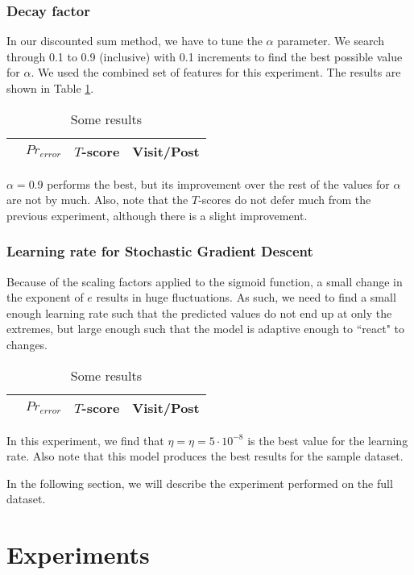 \subsubsection{Decay factor}
In our discounted sum method, we have to tune the $\alpha$ parameter. We search 
through 0.1 to 0.9 (inclusive) with 0.1 increments to find the best possible 
value for $\alpha$.  We used the combined set of features for this experiment.
The results are shown in Table \ref{tbl:par_tune_decay}.
\begin{table}
\begin{center}
\begin{tabular}{| l | c | c | c |}
\hline
		& $Pr_{error}$		  & $T$-score			   &	Visit/Post\\
\hline
	
\hline
\end{tabular}
\end{center}
\caption{Some results}\label{tbl:par_tune_decay}
\end{table}

$\alpha=0.9$ performs the best, but its improvement over the rest of the values 
for $\alpha$ are not by much. Also, note that the $T$-scores do not defer much 
from the previous experiment, although there is a slight improvement.

\subsubsection{Learning rate for Stochastic Gradient Descent}

Because of the scaling factors applied to the sigmoid function, a small change 
in the exponent of $e$ results in huge fluctuations. As such, we need to find a 
small enough learning rate such that the predicted values do not end up at only 
the extremes, but large enough such that the model is adaptive enough to 
``react" to changes.

\begin{table}
\begin{center}
\begin{tabular}{| l | c | c | c |}
\hline
		& $Pr_{error}$		  & $T$-score			   &	Visit/Post\\
\hline
	
\hline
\end{tabular}
\end{center}
\caption{Some results}\label{tbl:par_tune_learning}
\end{table}

In this experiment, we find that $\eta = \eta=5\cdot10^{-8}$ is the best value 
for the learning rate. Also note that this model produces the best results for 
the sample dataset.

In the following section, we will describe the experiment performed on the full 
dataset.

\section{Experiments}
